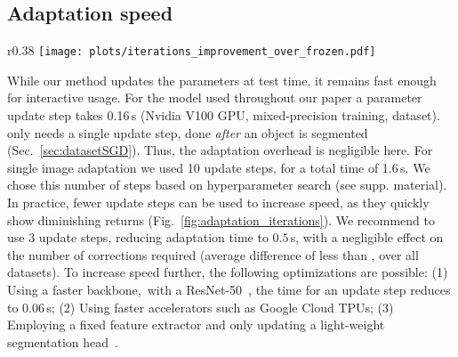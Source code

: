 \subsection{Adaptation speed}
\begin{wrapfigure}{r}{0.38\linewidth}
    \centering
    \texttt{[image: plots/iterations\_improvement\_over\_frozen.pdf]}
    \caption{Iterations \vs relative improvement over a \fixedmodellong{} (mean over all datasets).}
    \label{fig:adaptation_iterations}
\end{wrapfigure}
While our method updates the parameters at test time, it remains fast enough for interactive usage.
For the model used throughout our paper a parameter update step takes 0.16\,s (Nvidia V100 GPU, mixed-precision training, \berkeley{} dataset).
\uc\datasetSGD{} only needs a single update step, done \emph{after} an object is segmented (Sec.~\ref{sec:datasetSGD}).
Thus, the adaptation overhead is negligible here.
For single image adaptation we used 10 update steps, 
for a total time of 1.6\,s.
We chose this number of steps based on hyperparameter search (see supp. material).
In practice, fewer update steps can be used to increase speed,
as they quickly show diminishing returns (Fig.~\ref{fig:adaptation_iterations}). 
We recommend to use 3 update steps, reducing adaptation time to $0.5$\,s, with a negligible effect on the number of corrections required (average difference of less than , over all datasets).
\newline
\hspace{\parindent}
To increase speed further, the following optimizations are possible:
(1) Using a faster backbone,~\eg with a ResNet-50~\cite{he15arxiv}, the time for an update step reduces to 0.06\,s;
(2) Using faster accelerators such as Google Cloud TPUs;
(3) Employing a fixed feature extractor and only updating a light-weight segmentation head~\cite{li18cvpr}.


